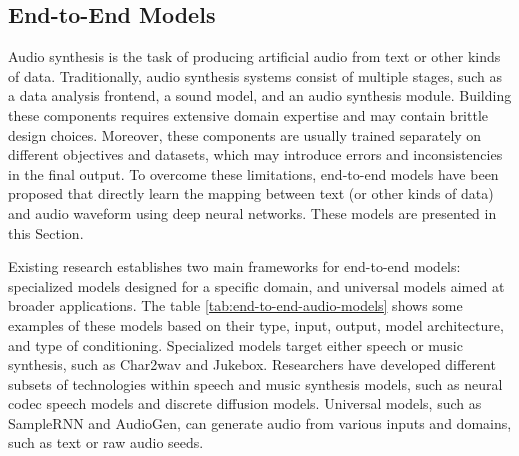 \subsection{End-to-End Models} \label{sec:end-to-end}

Audio synthesis is the task of producing artificial audio from text or other kinds of data. Traditionally, audio synthesis systems consist of multiple stages, such as a data analysis frontend, a sound model, and an audio synthesis module. Building these components requires extensive domain expertise and may contain brittle design choices. Moreover, these components are usually trained separately on different objectives and datasets, which may introduce errors and inconsistencies in the final output. To overcome these limitations, end-to-end models have been proposed that directly learn the mapping between text (or other kinds of data) and audio waveform using deep neural networks. These models are presented in this Section.

Existing research establishes two main frameworks for end-to-end models: specialized models designed for a specific domain, and universal models aimed at broader applications. The table \ref{tab:end-to-end-audio-models} shows some examples of these models based on their type, input, output, model architecture, and type of conditioning. Specialized models target either speech or music synthesis, such as Char2wav and Jukebox. Researchers have developed different subsets of technologies within speech and music synthesis models, such as neural codec speech models and discrete diffusion models. Universal models, such as SampleRNN and AudioGen, can generate audio from various inputs and domains, such as text or raw audio seeds.

